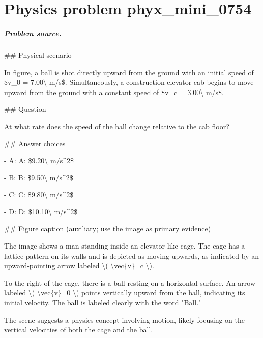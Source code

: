 
\chapter{Physics problem phyx\_mini\_0754}
\label{ch:PhyXMiniProblems_problem_phyx_mini_0754}

\paragraph{Problem source.}
\#\# Physical scenario

In figure, a ball is shot directly upward from the ground with an initial speed of \$v\_0 = 7.00\textbackslash{} m/s\$. Simultaneously, a construction elevator cab begins to move upward from the ground with a constant speed of \$v\_c = 3.00\textbackslash{} m/s\$.

\#\# Question

At what rate does the speed of the ball change relative to the cab floor?

\#\# Answer choices

- A: A: \$9.20\textbackslash{} m/s\textasciicircum{}2\$

- B: B: \$9.50\textbackslash{} m/s\textasciicircum{}2\$

- C: C: \$9.80\textbackslash{} m/s\textasciicircum{}2\$

- D: D: \$10.10\textbackslash{} m/s\textasciicircum{}2\$

\#\# Figure caption (auxiliary; use the image as primary evidence)

The image shows a man standing inside an elevator-like cage. The cage has a lattice pattern on its walls and is depicted as moving upwards, as indicated by an upward-pointing arrow labeled \textbackslash{}( \textbackslash{}vec\{v\}\_c \textbackslash{}).

To the right of the cage, there is a ball resting on a horizontal surface. An arrow labeled \textbackslash{}( \textbackslash{}vec\{v\}\_0 \textbackslash{}) points vertically upward from the ball, indicating its initial velocity. The ball is labeled clearly with the word "Ball."

The scene suggests a physics concept involving motion, likely focusing on the vertical velocities of both the cage and the ball.

